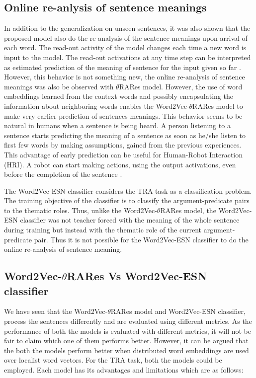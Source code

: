 \subsection{Online re-anlysis of sentence meanings}

In addition to the generalization on unseen sentences, it was also shown that the proposed model also do the re-analysis of the sentence meanings upon arrival of each word. The read-out activity of the model changes each time a new word is input to the model. The read-out activations at any time step can be interpreted as estimated prediction of the meaning of sentence for the input given so far \cite{xavier:2013:RT}. However, this behavior is not something new, the online re-analysis of sentence meanings was also be observed with $\theta$RARes model. However, the use of word embeddings learned from the context words and possibly encapsulating the information about neighboring words enables the Word2Vec-$\theta$RARes model to make very earlier prediction of sentences meanings. This behavior seems to be natural in humans when a sentence is being heard. A person listening to a sentence starts predicting the meaning of a sentence as soon as he/she listen to first few words by making assumptions, gained from the previous experiences. This advantage of early prediction can be useful for Human-Robot Interaction (HRI). A robot can start making actions, using the output activations, even before the completion of the sentence \cite{tra:xavier_hri}.

The Word2Vec-ESN classifier considers the TRA task as a classification problem. The training objective of the classifier is to classify the argument-predicate pairs to the thematic roles. Thus, unlike the Word2Vec-$\theta$RARes model, the Word2Vec-ESN classifier was not teacher forced with the meaning of the whole sentence during training but instead with the thematic role of the current argument-predicate pair. Thus it is not possible for the Word2Vec-ESN classifier to do the online re-analysis of sentence meaning.

\subsection{Word2Vec-$\theta$RARes Vs Word2Vec-ESN classifier}

We have seen that the Word2Vec-$\theta$RARes model and Word2Vec-ESN classifier, process the sentences differently and are evaluated using different metrics. As the performance of both the models is evaluated with different metrics, it will not be fair to claim which one of them performs better. However, it can be argued that the both the models perform better when distributed word embeddings are used over localist word vectors. For the TRA task, both the models could be employed. Each model has its advantages and limitations which are as follows:


